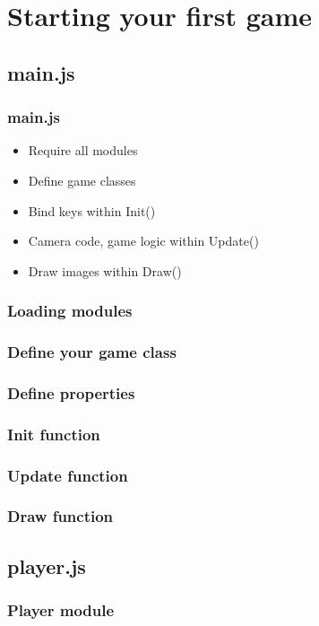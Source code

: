 \documentclass[red]{beamer}
\begin{document}
\section{Starting your first game}
\subsection{main.js}
\begin{frame}
    \frametitle{main.js}
    \begin{itemize}
        \item<1-> Require all modules
        \item<2-> Define game classes
        \item<3-> Bind keys within Init()
        \item<4-> Camera code, game logic within Update()
        \item<5-> Draw images within Draw()
    \end{itemize}
\end{frame}

\begin{frame}
    \frametitle{Loading modules}
        \lstlllll
\end{frame}

\begin{frame}
    \frametitle{Define your game class}
        \lstllllll

\end{frame}

\begin{frame}
    \frametitle{Define properties}
        \lstlllllll
\end{frame}

\begin{frame}
    \frametitle{Init function}
        \lstllllllll
\end{frame}

\begin{frame}
    \frametitle{Update function}
        \lstlllllllll
\end{frame}

\begin{frame}
    \frametitle{Draw function}
        \lstllllllllll
\end{frame}

\subsection{player.js}

\begin{frame}
    \frametitle{Player module}
        \lstlllllllllll
\end{frame}
\end{document}
